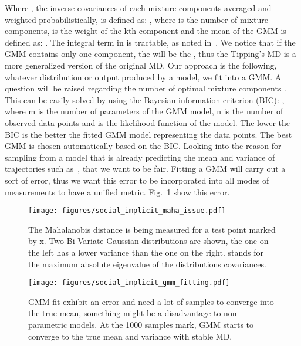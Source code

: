 \documentclass[runningheads]{llncs}
\begin{document}
Where , the inverse covariances of each mixture components averaged and weighted probabilistically, is defined as: 
, where  is the number of mixture components,  is the weight of the kth component and the mean of the GMM is defined as: . The integral term in  is tractable, as noted in~\cite{tipping1999deriving}. We notice that if the GMM contains only one component, the  will be the , thus the Tipping's MD is a more generalized version of the original MD. Our approach is the following, whatever distribution or output produced by a model, we fit into a GMM. A question will be raised regarding the number of optimal mixture components . This can be easily solved by using the Bayesian information criterion (BIC):
, where m is the number of parameters of the GMM model, n is the number of observed data points and  is the likelihood function of the model. The lower the BIC is the better the fitted GMM model representing the data points. The best GMM is chosen automatically based on the BIC. Looking into the reason for sampling from a model that is already predicting the mean and variance of trajectories such as~\cite{alahi2016social,mohamed2020social}, that we want to be fair. Fitting a GMM will carry out a sort of error, thus we want this error to be incorporated into all modes of measurements to have a unified metric. Fig.~\ref{gr:social_implicit_gmm_example} show this error.
\begin{figure}[!tbp]
  \centering
  \begin{minipage}[b]{0.49\textwidth}
    \texttt{[image: figures/social\_implicit\_maha\_issue.pdf]}
       \caption{The Mahalanobis distance is being measured for a test point marked by x. Two Bi-Variate Gaussian distributions are shown, the one on the left has a lower variance than the one on the right.  stands for the maximum absolute eigenvalue of the distributions covariances.}
    \label{gr:social_implicit_md_issue}
  \end{minipage}
    \hfill
  \begin{minipage}[b]{0.49\textwidth}
    \texttt{[image: figures/social\_implicit\_gmm\_fitting.pdf]}
       \caption{GMM fit exhibit an error and need a lot of samples to converge into the true mean, something might be a disadvantage to non-parametric models. At the 1000 samples mark, GMM starts to converge to the true mean and variance with stable MD.}
    \label{gr:social_implicit_gmm_example}
  \end{minipage}
\end{figure}
\end{document}
